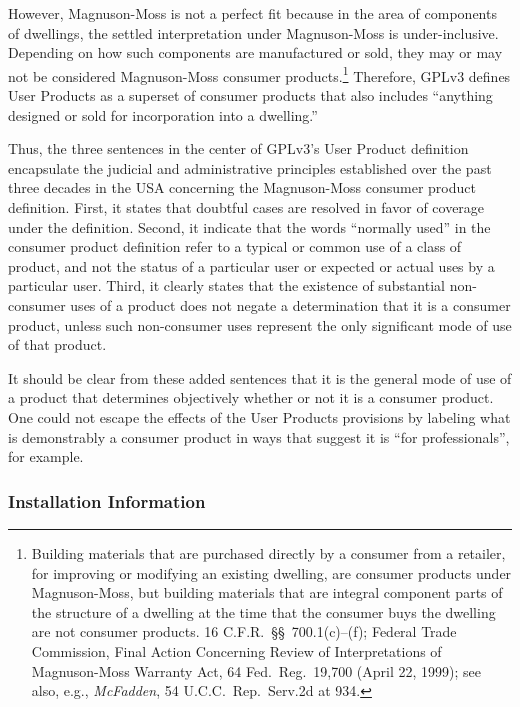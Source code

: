 However, Magnuson-Moss is not a perfect fit because in the area of components
of dwellings, the settled interpretation under Magnuson-Moss is under-inclusive.
Depending on how such components are manufactured or sold, they may or may
not be considered Magnuson-Moss consumer products.\footnote{Building
  materials that are purchased directly by a consumer from a retailer, for
  improving or modifying an existing dwelling, are consumer products under
  Magnuson-Moss, but building materials that are integral component parts of
  the structure of a dwelling at the time that the consumer buys the dwelling
  are not consumer products. 16 C.F.R.~\S\S~700.1(c)--(f); Federal Trade
  Commission, Final Action Concerning Review of Interpretations of
  Magnuson-Moss Warranty Act, 64 Fed.~Reg.~19,700 (April 22, 1999); see also,
  e.g., \textit{McFadden}, 54 U.C.C.~Rep.~Serv.2d at 934.}  Therefore, GPLv3
defines User Products as a superset of consumer products that also includes
``anything designed or sold for incorporation into a dwelling.''

Thus, the three sentences in the center of GPLv3's User Product definition
encapsulate the judicial and administrative principles established over the
past three decades in the USA concerning the Magnuson-Moss consumer product
definition.  First, it states that doubtful cases are resolved in favor of
coverage under the definition.  Second, it indicate that the words ``normally
used'' in the consumer product definition refer to a typical or common use of
a class of product, and not the status of a particular user or expected or
actual uses by a particular user.  Third, it clearly states that the
existence of substantial non-consumer uses of a product does not negate a
determination that it is a consumer product, unless such non-consumer uses
represent the only significant mode of use of that product.

It should be clear from these added sentences that it is the general mode of
use of a product that determines objectively whether or not it is a consumer
product.  One could not escape the effects of the User Products provisions by
labeling what is demonstrably a consumer product in ways that suggest it is
``for professionals'', for example.


\subsubsection{Installation Information}

\label{GPLv3-installation-information}

